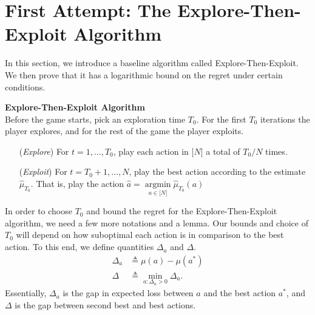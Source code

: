 \documentclass[11pt]{article}
\newcommand{\bN}{\lbrack N \rbrack}
\DeclareMathOperator*{\argmin}{argmin}
\begin{document}
\section{First Attempt: The Explore-Then-Exploit Algorithm}

In this section, we introduce a baseline algorithm called Explore-Then-Exploit. We then prove that it has a logarithmic bound on the regret under certain conditions. \\ 
\begin{addmargin}[1em]{0em}%
{\large \textbf{Explore-Then-Exploit Algorithm}} \\
Before the game starts, pick an exploration time $T_0$. For the first $T_0$ iterations the player explores, and for the rest of the game the player exploits.
\begin{itemize}[leftmargin =5em]
    \item[(\textit{Explore})] For $t=1,\ldots, T_0$, play each action in $\bN$ a total of $T_0/N$ times.
    \item[(\textit{Exploit})] For $t = T_0+1,\ldots, N$, play the best action according to the estimate $\hat{\mu}_{T_0}.$ That is, play the action $\hat{a} = \argmin\limits_{a \in \bN} \hat{\mu}_{T_0}(a)$
    
\end{itemize}

\end{addmargin} In order to choose $T_0$ and bound the regret for the Explore-Then-Exploit algorithm, we need a few more notations and a lemma. Our bounds and choice of $T_0$ will depend on how suboptimal each action is in comparison to the best action. To this end, we define quantities $\Delta_a$ and $\Delta.$ \begin{align*} \Delta_a &\triangleq \mu(a)-\mu(a^*)\\
\Delta &\triangleq \min\limits_{a : \Delta_a>0} \Delta_a.
\end{align*}  Essentially, $\Delta_a$ is the gap in expected loss between $a$ and the best action $a^*$, and $\Delta$ is the gap between second best and best actions.
\end{document}
